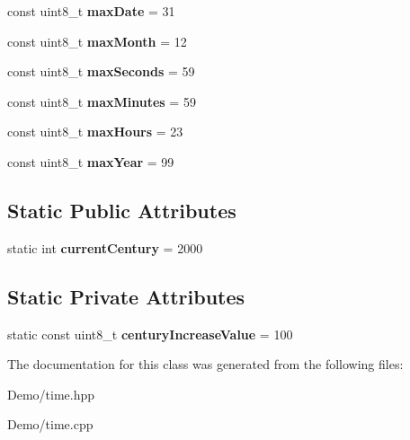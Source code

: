 \begin{DoxyCompactItemize}
const uint8\+\_\+t {\bfseries max\+Date} = 31
\item 
\mbox{\label{classtime_a8659af00b37397c512e0215ca3c0de4c}} 
const uint8\+\_\+t {\bfseries max\+Month} = 12
\item 
\mbox{\label{classtime_a551d68c0f849a515c468f2e1ff08711a}} 
const uint8\+\_\+t {\bfseries max\+Seconds} = 59
\item 
\mbox{\label{classtime_a8cd18e83ca72f75a2e37176ba297c271}} 
const uint8\+\_\+t {\bfseries max\+Minutes} = 59
\item 
\mbox{\label{classtime_a151534764ea356d9d9e7344a38b880ea}} 
const uint8\+\_\+t {\bfseries max\+Hours} = 23
\item 
\mbox{\label{classtime_a0602061dd6152dc250b172580a175d9e}} 
const uint8\+\_\+t {\bfseries max\+Year} = 99
\end{DoxyCompactItemize}
\subsection*{Static Public Attributes}
\begin{DoxyCompactItemize}
\item 
\mbox{\label{classtime_acab6780ebb25862cb83316cb967b8b57}} 
static int {\bfseries current\+Century} = 2000
\end{DoxyCompactItemize}
\subsection*{Static Private Attributes}
\begin{DoxyCompactItemize}
\item 
\mbox{\label{classtime_af12b7ed0d7ff922e00ecb46dabdaede6}} 
static const uint8\+\_\+t {\bfseries century\+Increase\+Value} = 100
\end{DoxyCompactItemize}


The documentation for this class was generated from the following files\+:\begin{DoxyCompactItemize}
\item 
Demo/time.\+hpp\item 
Demo/time.\+cpp\end{DoxyCompactItemize}
